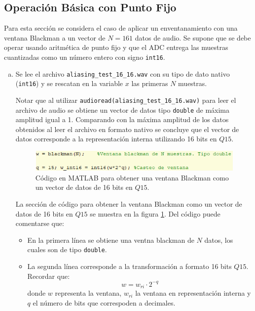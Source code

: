 \subsection{Operación Básica con Punto Fijo}

Para esta sección se considera el caso de aplicar un enventanamiento con una ventana Blackman a un vector de $N=161$ datos de audio. Se supone que se debe operar usando aritmética de punto fijo y que el ADC entrega las muestras cuantizadas como un número entero con signo \texttt{int16}.

\begin{enumerate}[a)]
    \item Se lee el archivo \texttt{aliasing\_test\_16\_16.wav} con su tipo de dato nativo (\texttt{int16}) y se rescatan en la variable $x$ las primeras $N$ muestras.
    
    Notar que al utilizar \texttt{audioread(aliasing\_test\_16\_16.wav)} para leer el archivo de audio se obtiene un vector de datos tipo \texttt{double} de máxima amplitud igual a 1. Comparando con la máxima amplitud de los datos obtenidos al leer el archivo en formato nativo se concluye que el vector de datos corresponde a la representación interna utilizando 16 bits en $Q15$.
    
    \begin{figure}[H]
        \centering
        \includegraphics{imagenes2/p6_blackman.png}
        \caption{Código en MATLAB para obtener una ventana Blackman como un vector de datos de 16 bits en $Q15$.}
        \label{fig:p6_blackman}
    \end{figure}
    
    La sección de código para obtener la ventana Blackman como un vector de datos de 16 bits en $Q15$ se muestra en la figura \ref{fig:p6_blackman}. Del código puede comentarse que:
    \begin{itemize}
        \item En la primera línea se obtiene una ventna blackman de $N$ datos, los cuales son de tipo \texttt{double}.
        \item La segunda línea corresponde a la transformación a formato 16 bits $Q15$. Recordar que:
        $$ w = w_{ri}\cdot 2^{-q}$$
        donde $w$ representa la ventana, $w_{ri}$ la ventana en representación interna y $q$ el número de bits que correspoden a decimales.
        

\end{itemize}
\end{enumerate}
